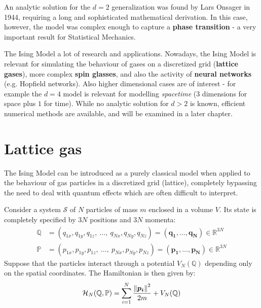 \documentclass[../../main.tex]{subfiles}
\begin{document}
An analytic solution for the $d=2$ generalization was found by Lars Onsager in 1944, requiring a long and sophisticated mathematical derivation. In this case, however, the model was complex enough to capture a \textbf{phase transition} - a very important result for Statistical Mechanics. 

The Ising Model a lot of research and applications. %
 Nowadays, the Ising Model is relevant for simulating the behaviour of gases on a discretized grid (\textbf{lattice gases}), more complex \textbf{spin glasses}, and also the activity of \textbf{neural networks} (e.g. Hopfield networks). Also higher dimensional cases are of interest - for example the $d=4$ model is relevant for modelling \textit{spacetime} ($3$ dimensions for space plus $1$ for time). While no analytic solution for $d > 2$ is known, efficient numerical methods are available, and will be examined in a later chapter.

\section{Lattice gas}
The Ising Model can be introduced as a purely classical model when applied to the behaviour of gas particles in a discretized grid (lattice), completely bypassing the need to deal with quantum effects which are often difficult to interpret.

\medskip

Consider a system $\mathcal{S}$ of $N$ particles of mass $m$ enclosed in a volume $V$. Its state is completely specified by $3N$ positions and $3N$ momenta:
\begin{align*}
    \mathbb{Q} &= (q_{1x}, q_{1y}, q_{1z},\> \dots,\> q_{Nx}, q_{Ny}, q_{Nz}) = (\bm{q_1}, \dots, \bm{q_N})\in \mathbb{R}^{3N}\\
    \mathbb{P} &= (p_{1x}, p_{1y}, p_{1z},\>\dots, \> p_{Nx}, p_{Ny}, p_{Nz}) = (\bm{p_1}, \dots, \bm{p_N}) \in \mathbb{R}^{3N}
\end{align*}
Suppose that the particles interact through a potential $V_N(\mathbb{Q})$ depending only on the spatial coordinates. The Hamiltonian is then given by:
\begin{align}\label{eqn:hamiltonian-lattice}
    \mathcal{H}_{N}(\mathbb{Q}, \mathbb{P}) = \sum_{i=1}^N \frac{\norm{\bm{p_i}}^2}{2m} + V_N(\mathbb{Q})
\end{align}
\end{document}
